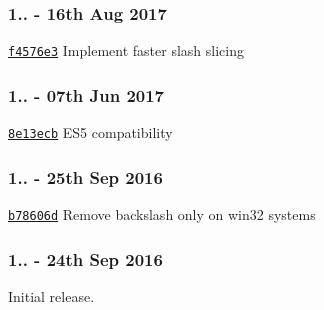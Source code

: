 \subsubsection*{1.. -\/ 16th Aug 2017}


\begin{DoxyItemize}
\item \href{https://github.com/darsain/remove-trailing-separator/commit/f4576e3638c39b794998b533fffb27854dcbee01}{\tt f4576e3} Implement faster slash slicing
\end{DoxyItemize}

\subsubsection*{1.. -\/ 07th Jun 2017}


\begin{DoxyItemize}
\item \href{https://github.com/darsain/remove-trailing-separator/commit/8e13ecbfd7b9f5fdf97c5d5ff923e4718b874e31}{\tt 8e13ecb} E\+S5 compatibility
\end{DoxyItemize}

\subsubsection*{1.. -\/ 25th Sep 2016}


\begin{DoxyItemize}
\item \href{https://github.com/darsain/remove-trailing-separator/commit/af90b4e153a4527894741af6c7005acaeb78606d}{\tt b78606d} Remove backslash only on win32 systems
\end{DoxyItemize}

\subsubsection*{1.. -\/ 24th Sep 2016}

Initial release. 